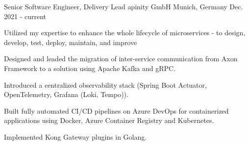 

\begin{cventries}

    \cventry
    {Senior Software Engineer, Delivery Lead} %
    {apinity GmbH} %
    {Munich, Germany} %
    {Dec. 2021 - current} %
    {
        \begin{cvitems} %
            \item {Utilized my expertise to enhance the whole lifecycle of microservices - to design, develop, test, deploy, maintain, and improve}
            \item {Designed and leaded the migration of inter-service communication from Axon Framework to a solution using Apache Kafka and gRPC.}
            \item {Introduced a centralized observability stack (Spring Boot Actuator, OpenTelemetry, Grafana (Loki, Tempo)).}
            \item {Built fully automated CI/CD pipelines on Azure DevOps for containerized applications using Docker, Azure Container Registry and Kubernetes.}
            \item {Implemented Kong Gateway plugins in Golang.}
        \end{cvitems}
    }


\end{cventries}
